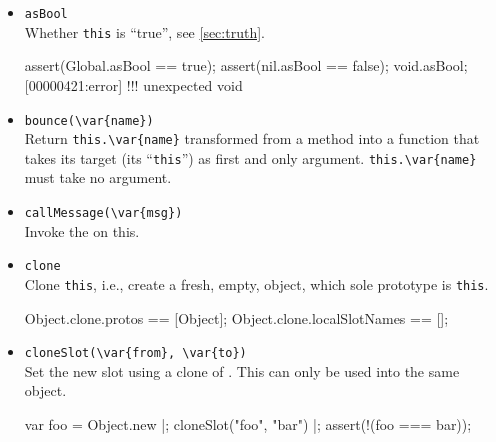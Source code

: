 \begin{itemize}
\item \lstinline|asBool|\\
  Whether \lstinline|this| is ``true'', see \autoref{sec:truth}.

\begin{urbiscript}
assert(Global.asBool == true);
assert(nil.asBool ==    false);
void.asBool;
[00000421:error] !!! unexpected void
\end{urbiscript}

\item \lstinline|bounce(\var{name})|\\
  Return \lstinline|this.\var{name}| transformed from a method into a
  function that takes its target (its ``\lstinline|this|'') as first
  and only argument.  \lstinline|this.\var{name}| must take no
  argument.

\item \lstinline|callMessage(\var{msg})|\\
  Invoke the   on this.

\item \lstinline|clone|\\
  Clone \lstinline|this|, i.e., create a fresh, empty, object, which
  sole prototype is \lstinline|this|.
\begin{urbiassert}
Object.clone.protos == [Object];
Object.clone.localSlotNames == [];
\end{urbiassert}

\item \lstinline|cloneSlot(\var{from}, \var{to})|\\
  Set the new slot  using a clone of . This can only
  be used into the same object.

\begin{urbiscript}
var foo = Object.new |;
cloneSlot("foo", "bar") |;
assert(!(foo === bar));
\end{urbiscript}


\end{itemize}
